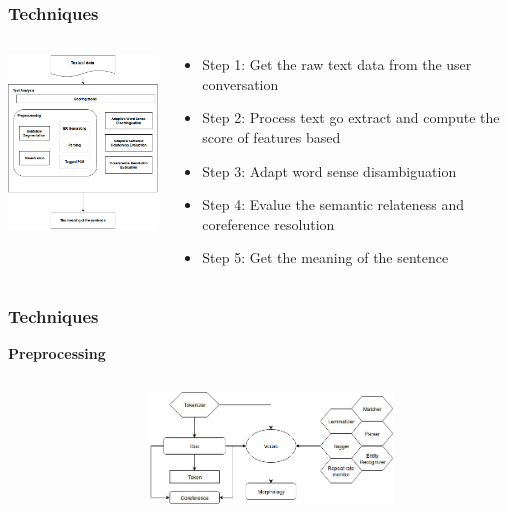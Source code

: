 \documentclass{beamer}
\begin{document}
\begin{frame}
	\frametitle{Techniques}
	\begin{columns}[T]
		\begin{column}{.5\textwidth}
					\includegraphics[width=55mm]{f21.jpg}
		\end{column}
		\begin{column}{.5\textwidth}
			
		\begin{itemize}
		\item Step 1: Get the raw text data from the user conversation
		\item Step 2: Process text go extract and compute the score of features based 
		\item Step 3: Adapt word sense disambiguation
		\item Step 4: Evalue the semantic relateness and coreference resolution
		\item Step 5: Get the meaning of the sentence
	\end{itemize}
			
		\end{column}
	\end{columns}

\end{frame}
\begin{frame}
\frametitle{Techniques}
\textbf{Preprocessing} 
\begin{columns}[T]
	\begin{column}{.3\textwidth}
		
	\end{column}
	\begin{column}{.7\textwidth}
		
		\includegraphics[width=65mm]{f5.jpg}
		
	\end{column}
\end{columns}

\end{frame}
\end{document}
